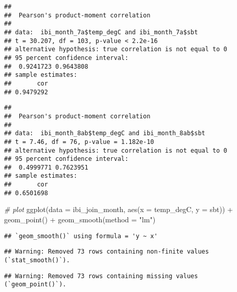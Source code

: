 \documentclass[
]{article}
\newenvironment{Shaded}{\begin{snugshade}}{\end{snugshade}}
\newcommand{\AttributeTok}[1]{\textcolor[rgb]{0.77,0.63,0.00}{#1}}
\newcommand{\CommentTok}[1]{\textcolor[rgb]{0.56,0.35,0.01}{\textit{#1}}}
\newcommand{\FunctionTok}[1]{\textcolor[rgb]{0.00,0.00,0.00}{#1}}
\newcommand{\NormalTok}[1]{#1}
\newcommand{\SpecialCharTok}[1]{\textcolor[rgb]{0.00,0.00,0.00}{#1}}
\newcommand{\StringTok}[1]{\textcolor[rgb]{0.31,0.60,0.02}{#1}}
\begin{document}
\begin{verbatim}
## 
##  Pearson's product-moment correlation
## 
## data:  ibi_month_7a$temp_degC and ibi_month_7a$sbt
## t = 30.207, df = 103, p-value < 2.2e-16
## alternative hypothesis: true correlation is not equal to 0
## 95 percent confidence interval:
##  0.9241723 0.9643808
## sample estimates:
##       cor 
## 0.9479292
\end{verbatim}

\begin{Shaded}
\end{Shaded}

\begin{verbatim}
## 
##  Pearson's product-moment correlation
## 
## data:  ibi_month_8ab$temp_degC and ibi_month_8ab$sbt
## t = 7.46, df = 76, p-value = 1.182e-10
## alternative hypothesis: true correlation is not equal to 0
## 95 percent confidence interval:
##  0.4999771 0.7623951
## sample estimates:
##       cor 
## 0.6501698
\end{verbatim}

\begin{Shaded}
\begin{Highlighting}[]
\CommentTok{\# plot}
\FunctionTok{ggplot}\NormalTok{(}\AttributeTok{data =}\NormalTok{ ibi\_join\_month, }\FunctionTok{aes}\NormalTok{(}\AttributeTok{x =}\NormalTok{ temp\_degC, }\AttributeTok{y =}\NormalTok{ sbt)) }\SpecialCharTok{+} \FunctionTok{geom\_point}\NormalTok{() }\SpecialCharTok{+} \FunctionTok{geom\_smooth}\NormalTok{(}\AttributeTok{method =} \StringTok{"lm"}\NormalTok{)}
\end{Highlighting}
\end{Shaded}

\begin{verbatim}
## `geom_smooth()` using formula = 'y ~ x'
\end{verbatim}

\begin{verbatim}
## Warning: Removed 73 rows containing non-finite values (`stat_smooth()`).
\end{verbatim}

\begin{verbatim}
## Warning: Removed 73 rows containing missing values (`geom_point()`).
\end{verbatim}
\end{document}
